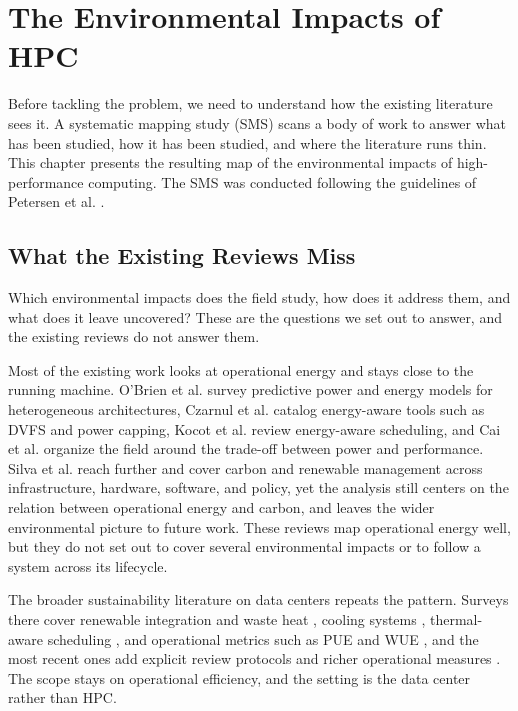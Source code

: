 \chapter{The Environmental Impacts of HPC}
\label{ch:mapping}

Before tackling the problem, we need to understand how the existing literature sees it. A systematic mapping study (SMS) scans a body of work to answer what has been studied, how it has been studied, and where the literature runs thin. This chapter presents the resulting map of the environmental impacts of high-performance computing. The SMS was conducted following the guidelines of Petersen et al. \parencite{petersen2008Systematic}.

\section{What the Existing Reviews Miss}

Which environmental impacts does the field study, how does it address them, and what does it leave uncovered? These are the questions we set out to answer, and the existing reviews do not answer them.

Most of the existing work looks at operational energy and stays close to the running machine. O'Brien et al. \parencite{obrien2018Survey} survey predictive power and energy models for heterogeneous architectures, Czarnul et al. \parencite{czarnul2019EnergyAware} catalog energy-aware tools such as DVFS and power capping, Kocot et al. \parencite{kocot2023EnergyAware} review energy-aware scheduling, and Cai et al. \parencite{cai2011EnergyAware} organize the field around the trade-off between power and performance. Silva et al. \parencite{silva2024Review} reach further and cover carbon and renewable management across infrastructure, hardware, software, and policy, yet the analysis still centers on the relation between operational energy and carbon, and leaves the wider environmental picture to future work. These reviews map operational energy well, but they do not set out to cover several environmental impacts or to follow a system across its lifecycle.

The broader sustainability literature on data centers repeats the pattern. Surveys there cover renewable integration and waste heat \parencite{shuja2016Sustainable}, cooling systems \parencite{zhang2021Survey}, thermal-aware scheduling \parencite{chaudhry2015ThermalAware}, and operational metrics such as PUE and WUE \parencite{nagarathinam2024Green}, and the most recent ones add explicit review protocols and richer operational measures \parencite{kahil2025Reinforcement, safari2025Systematic, kumar2026Sustainable}. The scope stays on operational efficiency, and the setting is the data center rather than HPC.

